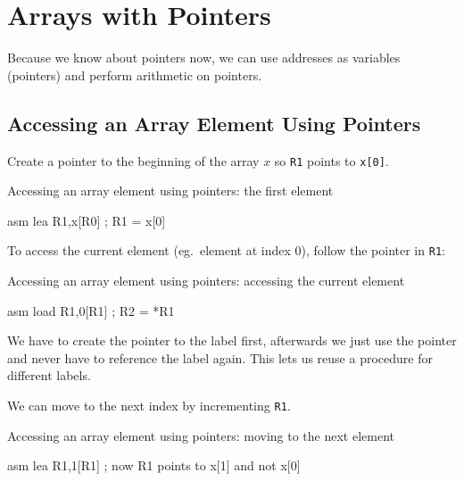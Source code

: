 \section{Arrays with Pointers}\label{sec:arrays_with_pointers}

Because we know about pointers now, we can use addresses as variables (pointers) and perform arithmetic on pointers.

\subsection{Accessing an Array Element Using Pointers}\label{sub:accessing_an_array_element_using_pointers}

Create a pointer to the beginning of the array \(x\) so \texttt{R1} points to \texttt{x[0]}.

\begin{highlight}{Accessing an array element using pointers: the first element}
    \begin{code}{asm}
        lea R1,x[R0] ; R1 = x[0]
    \end{code}
\end{highlight}

\noindent
To access the current element (eg.\ element at index \(0\)), follow the pointer in \texttt{R1}:

\begin{highlight}{Accessing an array element using pointers: accessing the current element}
    \begin{code}{asm}
        load R1,0[R1] ; R2 = *R1
    \end{code}
\end{highlight}

\begin{note}
    We have to create the pointer to the label first, afterwards we just use the pointer and never have to reference the label again.
    This lets us reuse a procedure for different labels.
\end{note}

\noindent
We can move to the next index by incrementing \texttt{R1}.

\begin{highlight}{Accessing an array element using pointers: moving to the next element}
    \begin{code}{asm}
        lea R1,1[R1] ; now R1 points to x[1] and not x[0]
    \end{code}
\end{highlight}

